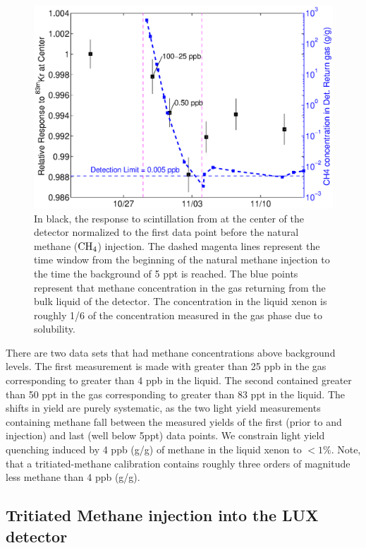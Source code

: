 \renewcommand{\baselinestretch}{1}
\small\normalsize
\begin{figure}[h!]\centering
\includegraphics[width=120mm]{Chapter_T/Figures/CH4/CH4_Kr.eps}
\caption{In black, the response to scintillation from \KrCal at the center of the detector normalized to the first data point before the natural methane ($\rm CH_4$) injection. The dashed magenta lines represent the time window from the beginning of the natural methane injection to the time the background of 5 ppt is reached. The blue points represent that methane concentration in the gas returning from the bulk liquid of the detector. The concentration in the liquid xenon is roughly 1/6 of the concentration measured in the gas phase due to solubility.  }
\label{fig:Methane_LY}
\end{figure}
\renewcommand{\baselinestretch}{2}
\small\normalsize

There are two \KrCal data sets that had methane concentrations above background levels. The first measurement is made with greater than 25 ppb in the gas corresponding to greater than 4 ppb in the liquid. The second contained greater than 50 ppt in the gas corresponding to greater than 83 ppt in the liquid. The shifts in yield are purely systematic, as the two light yield measurements containing methane fall between the measured yields of the first (prior to and injection) and last (well below 5ppt) data points. We constrain light yield quenching induced by 4 ppb (g/g) of methane in the liquid xenon to $<1\%$. Note, that a tritiated-methane calibration contains roughly three orders of magnitude less methane than 4 ppb (g/g).


\subsection{Tritiated Methane injection into the LUX detector}

